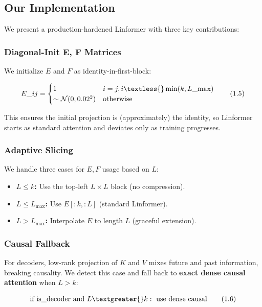 \subsection{Our Implementation}

We present a production-hardened Linformer with three key contributions:

\subsubsection{Diagonal-Init E, F Matrices}

We initialize $E$ and $F$ as identity-in-first-block:

\[
E\_{ij} = \begin{cases} 1 & i = j, i \textless{} \min(k, L\_\text{max}) \\ \sim \mathcal{N}(0, 0.02^2) & \text{otherwise} \end{cases}
\tag{1.5}
\]

This ensures the initial projection is (approximately) the identity, so 
Linformer starts as standard attention and deviates only as training 
progresses.

\subsubsection{Adaptive Slicing}

We handle three cases for $E, F$ usage based on $L$:

\begin{itemize}
\item \textbf{$L \leq k$:} Use the top-left $L \times L$ block (no compression).
\item \textbf{$L \leq L_\text{max}$:} Use $E[:k, :L]$ (standard Linformer).
\item \textbf{$L > L_\text{max}$:} Interpolate $E$ to length $L$ (graceful extension).

\end{itemize}
\subsubsection{Causal Fallback}

For decoders, low-rank projection of $K$ and $V$ mixes future and past 
information, breaking causality. We detect this case and fall back to 
\textbf{exact dense causal attention} when $L > k$:

\[
\text{if } \text{is\_decoder} \text{ and } L \textgreater{} k: \text{ use dense causal}
\tag{1.6}
\]

